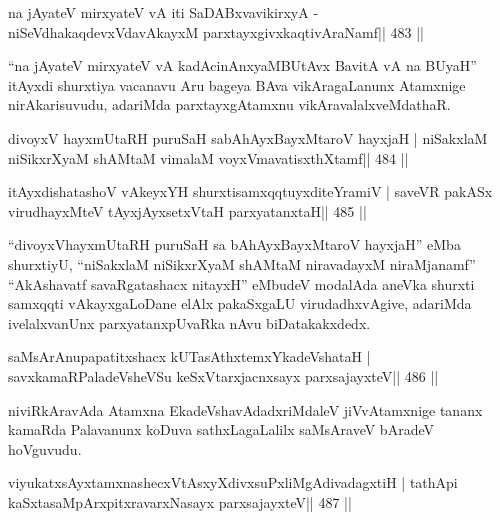 \begin{shl}
na jAyateV mirxyateV vA iti SaDABxvavikirxyA -
niSeVdhakaqdevxVdavAkayxM parxtayxgivxkaqtivAraNamf\hfill || 483 ||
\end{shl}

\begin{artha}
``na jAyateV mirxyateV vA kadAcinAnxyaMBUtAvx BavitA vA na BUyaH''   itAyxdi shurxtiya vacanavu Aru bageya BAva vikAragaLanunx Atamxnige   nirAkarisuvudu, adariMda  parxtayxgAtamxnu vikAravalalxveMdathaR.
\end{artha}



\begin{shl}
divoyxV hayxmUtaRH puruSaH sabAhAyxBayxMtaroV hayxjaH |
niSakxlaM niSikxrXyaM shAMtaM vimalaM voyxVmavatisxthXtamf\hfill || 484 ||
\end{shl}

\begin{shl}
itAyxdishatashoV vAkeyxYH shurxtisamxqqtuyxditeYramiV |
saveVR pakASx virudhayxMteV tAyxjAyxsetxV\s taH parxyatanxtaH\hfill || 485 ||
\end{shl}

\begin{artha}
``divoyxVhayxmUtaRH puruSaH sa bAhAyxBayxMtaroV hayxjaH'' eMba   shurxtiyU, ``niSakxlaM niSikxrXyaM shAMtaM niravadayxM niraMjanamf''   ``AkAshavatf savaRgatashacx nitayxH'' eMbudeV modalAda aneVka   shurxti samxqqti vAkayxgaLoDane elAlx pakaSxgaLU virudadhxvAgive,   adariMda ivelalxvanUnx parxyatanxpUvaRka nAvu biDatakakxdedx.
\end{artha}



\begin{shl}
saMsArAnupapatitxshacx kUTasAthxtemxYkadeVshataH |
savxkamaRPaladeVsheVSu keSxVtarxjacnxsayx parxsajayxteV\hfill || 486 ||
\end{shl}

\begin{artha}
niviRkAravAda Atamxna EkadeVshavAdadxriMdaleV jiVvAtamxnige tananx kamaRda Palavanunx koDuva sathxLagaLalilx saMsAraveV bAradeV hoVguvudu.
\end{artha}

\begin{shl}
viyukatxsAyx\s\s tamxnashecxVtAsxyXdivxsuPxliMgAdivadagxtiH |
tathA\s pi kaSxtasaMpArxpitxravarxNasayx parxsajayxteV\hfill || 487 ||
\end{shl}

